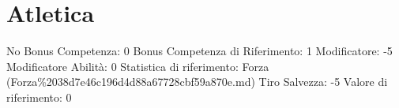 \section{Atletica}\label{atletica}

\begin{description}
\tightlist
\item[Tags: ABI]
No Bonus Competenza: 0 Bonus Competenza di Riferimento: 1 Modificatore:
-5 Modificatore Abilità: 0 Statistica di riferimento: Forza
(Forza\%2038d7e46c196d4d88a67728cbf59a870e.md) Tiro Salvezza: -5 Valore
di riferimento: 0
\end{description}
